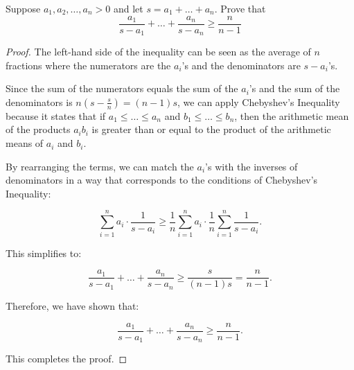 \documentclass[
	12pt, %
	fleqn, %
	a4paper, %
]{LegrandOrangeBook}
\begin{document}
\begin{exercise}
    Suppose \(a_1, a_2, \ldots, a_n > 0\) and let \(s = a_1 + \ldots + a_n\). Prove that
\[ \frac{a_1}{s - a_1} + \ldots + \frac{a_n}{s - a_n} \geq \frac{n}{n - 1} \]
\end{exercise}
\begin{proof}
    
    The left-hand side of the inequality can be seen as the average of \(n\) fractions where the numerators are the \(a_i\)'s and the denominators are \(s - a_i\)'s.
    
    Since the sum of the numerators equals the sum of the \(a_i\)'s and the sum of the denominators is \(n(s - \frac{s}{n}) = (n-1)s\), we can apply Chebyshev's Inequality because it states that if \(a_1 \leq \ldots \leq a_n\) and \(b_1 \leq \ldots \leq b_n\), then the arithmetic mean of the products \(a_ib_i\) is greater than or equal to the product of the arithmetic means of \(a_i\) and \(b_i\).
    
    By rearranging the terms, we can match the \(a_i\)'s with the inverses of denominators in a way that corresponds to the conditions of Chebyshev's Inequality:
    
    \[ \sum_{i=1}^n a_i \cdot \frac{1}{s - a_i} \geq \frac{1}{n} \sum_{i=1}^n a_i \cdot \frac{1}{n} \sum_{i=1}^n \frac{1}{s - a_i}. \]
    
    This simplifies to:
    
    \[ \frac{a_1}{s - a_1} + \ldots + \frac{a_n}{s - a_n} \geq \frac{s}{(n-1)s} = \frac{n}{n-1}. \]
    
    Therefore, we have shown that:
    
    \[ \frac{a_1}{s - a_1} + \ldots + \frac{a_n}{s - a_n} \geq \frac{n}{n - 1}. \]
    
    This completes the proof.
    
\end{proof}
\end{document}
